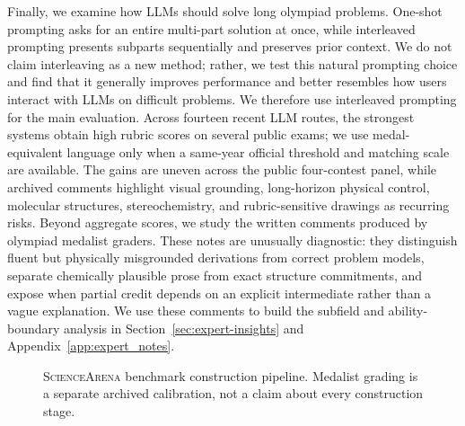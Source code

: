 \documentclass[11pt]{article}
\begin{document}
Finally, we examine how LLMs should solve long olympiad problems.
One-shot prompting asks for an entire multi-part solution at once, while interleaved prompting presents subparts sequentially and preserves prior context.
We do not claim interleaving as a new method; rather, we test this natural prompting choice and find that it generally improves performance and better resembles how users interact with LLMs on difficult problems.
We therefore use interleaved prompting for the main evaluation.
Across fourteen recent LLM routes, the strongest systems obtain high rubric scores on several public exams; we use medal-equivalent language only when a same-year official threshold and matching scale are available.
The gains are uneven across the public four-contest panel, while archived comments highlight visual grounding, long-horizon physical control, molecular structures, stereochemistry, and rubric-sensitive drawings as recurring risks.
Beyond aggregate scores, we study the written comments produced by olympiad medalist graders.
These notes are unusually diagnostic: they distinguish fluent but physically misgrounded derivations from correct problem models, separate chemically plausible prose from exact structure commitments, and expose when partial credit depends on an explicit intermediate rather than a vague explanation.
We use these comments to build the subfield and ability-boundary analysis in Section~\ref{sec:expert-insights} and Appendix~\ref{app:expert_notes}.

\begin{figure}[htbp]
\centering
\setlength{\abovecaptionskip}{0.1cm}
\caption{\textsc{ScienceArena} benchmark construction pipeline. Medalist grading is a separate archived calibration, not a claim about every construction stage.}
\label{fig:benchmark-pipeline}
\vspace{-0.4cm}
\end{figure}
\end{document}
